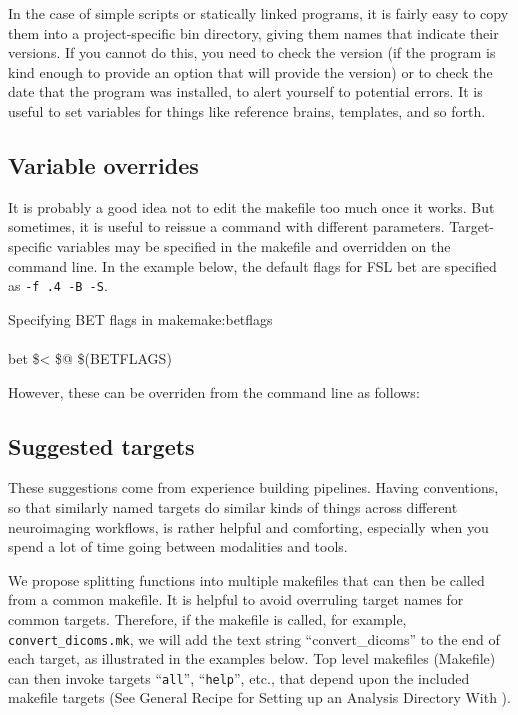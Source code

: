 In the case of simple scripts or statically linked programs, it is fairly easy to copy them into a project-specific bin directory, giving them names that indicate their versions. If you cannot do this, you need to check the version (if the program is kind enough to provide an option that will provide the version) or to check the date that the program was installed, to alert yourself to potential errors. It is useful to set variables for things like reference brains, templates, and so forth. 

\subsection{Variable overrides}
It is probably a good idea not to edit the makefile too much once it works. But sometimes, it is useful to reissue a command with different parameters. Target-specific variables may be specified in the makefile and overridden on the command line. In the example below, the default flags for FSL bet are specified as \texttt{-f .4 -B -S}.

\begin{make}{Specifying BET flags in make}{make:betflags}
	 \\
	 \\
	\tab bet \$< \$@ \$(BETFLAGS) \\
\end{make}

However, these can be overriden from the command line as follows:


\subsection{Suggested targets}
These suggestions come from experience building pipelines. Having conventions, so that similarly named targets do similar kinds of things across different neuroimaging workflows, is rather helpful and comforting, especially when you spend a lot of time going between modalities and tools.

We propose splitting functions into multiple makefiles that can then be called from a common makefile. It is helpful to avoid overruling target names for common targets. Therefore, if the makefile is called, for example, \texttt{convert_dicoms.mk}, we will add the text string ``convert_dicoms'' to the end of each target, as illustrated in the examples below. Top level makefiles (Makefile) can then invoke targets ``\texttt{all}'', ``\texttt{help}'', etc., that depend upon the included makefile targets (See General Recipe for Setting up an Analysis Directory With \maken{}). \\

